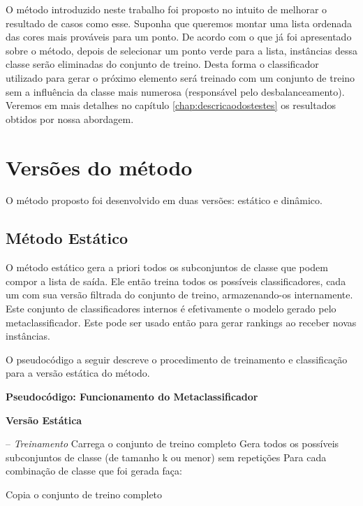 O método introduzido neste trabalho foi proposto no intuito de melhorar o resultado de casos como esse.
Suponha que queremos montar uma lista ordenada das cores mais prováveis para um ponto.
De acordo com o que já foi apresentado sobre o método, depois de selecionar um ponto verde para a lista, instâncias dessa classe serão eliminadas do conjunto de treino.
Desta forma o classificador utilizado para gerar o próximo elemento será treinado com um conjunto de treino sem a influência da classe mais numerosa (responsável pelo desbalanceamento).
Veremos em mais detalhes no capítulo \ref{chap:descricaodostestes} os resultados obtidos por nossa abordagem.

\section{Versões do método}
\label{sec:versoesdometodo}

O método proposto foi desenvolvido em duas versões: estático e dinâmico.


\subsection{Método Estático}

O método estático gera a priori todos os subconjuntos de classe que podem compor a lista de saída. 
Ele então treina todos os possíveis classificadores, cada um com sua versão filtrada do conjunto de treino, armazenando-os internamente.
Este conjunto de classificadores internos é efetivamente o modelo gerado pelo metaclassificador. 
Este pode ser usado então para gerar rankings ao receber novas instâncias. 

O pseudocódigo a seguir descreve o procedimento de treinamento e classificação para a versão estática do método.
\\

\hline
\begin{center}
\textbf{Pseudocódigo: Funcionamento do Metaclassificador}

\textbf{Versão Estática}
\end{center}
\hline
\hfill \break
-- \textit{Treinamento}\newline
Carrega o conjunto de treino completo\newline
Gera todos os possíveis subconjuntos de classe (de tamanho k ou menor) sem repetições\newline
Para cada combinação de classe que foi gerada faça:

\quad Copia o conjunto de treino completo

